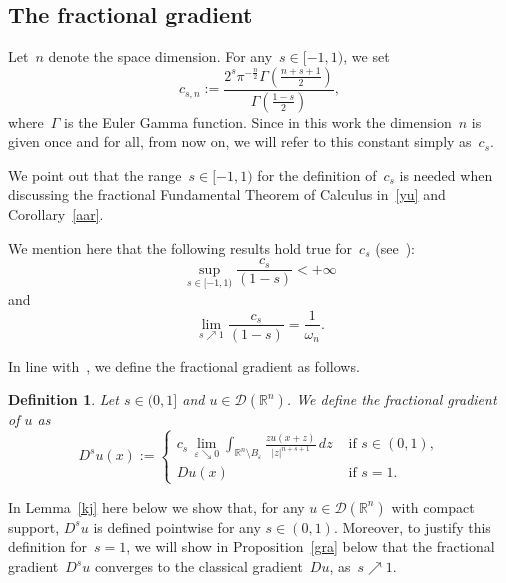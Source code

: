 \documentclass[11pt,hyp,]{nyjm}
\numberwithin{equation}{section}
\newcommand{\R}{\mathbb{R}}
\newtheorem{definition}[theorem]{Definition}
\theoremstyle{remark}
\renewcommand{\epsilon}{\varepsilon}
\begin{document}
\subsection{The fractional gradient}\label{gitti}		
Let~$n$ denote the space dimension. For any~$s \in [-1,1)$, we set 
			\begin{equation}\label{constant}
				c_{s,n} := \frac{2^{s} \pi^{-\frac{n}{2}} \Gamma(\frac{n+s+1}{2})}{\Gamma(\frac{1-s}{2})},    
			\end{equation}
			where~$\Gamma$ is the Euler Gamma function. Since in this work the dimension~$n$ is given once and for all, from now on, we will refer to this constant simply as~$c_s$. 
			
We point out that the range~$s \in [-1,1)$ for the definition of~$c_s$ is needed when discussing
the fractional Fundamental Theorem of Calculus in~\eqref{yu} and Corollary~\ref{aar}.

			We mention here that the following results hold true for~$c_s$ (see~\cite[Lemma~2.4]{mora}):
			\begin{equation}\label{constdef}
\sup_{s \in [-1,1)} \frac{c_s}{(1-s)} < + \infty  \end{equation} and
\begin{equation}\label{gf}
 \lim_{s \nearrow 1} \frac{c_s}{(1-s)} = \frac{1}{\omega_n}. 
			\end{equation}

In line with~\cite{comi, silhavi}, we define the fractional gradient as follows.
\begin{definition}\label{curate}
Let $s \in (0,1]$ and $u \in \mathcal{D}(\R^n)$. We define the fractional gradient of $u$ as
			\begin{equation}\label{def}
				D^s u (x) := 
				\begin{cases}\displaystyle
					c_{s} \,\lim_{\epsilon \searrow 0} \displaystyle\int_{\R^n \setminus B_{\epsilon}} \frac{z u(x+z)}{|z|^{n+s+1}} \, dz & \mbox{ if } s \in(0,1), \\
					Du(x) & \mbox{ if } s=1.
				\end{cases}
			\end{equation}
\end{definition}
In Lemma~\ref{kj} here below we show that, for any $u \in\mathcal{D}(\R^n)$ with compact support, $D^s u$ is defined pointwise for any $s \in (0,1)$. Moreover, to justify this definition for~$s=1$, we will show in Proposition~\ref{gra} below
that the fractional gradient~$D^su$ converges to the classical gradient~$Du$, as~$s \nearrow 1$.
\end{document}
